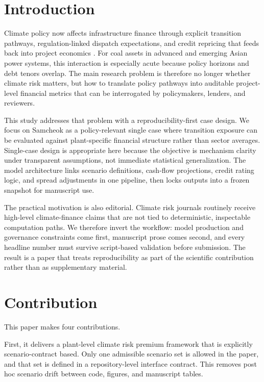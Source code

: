 \documentclass[preprint,12pt]{elsarticle}
\begin{document}
\section{Introduction}
Climate policy now affects infrastructure finance through explicit transition pathways, regulation-linked dispatch expectations, and credit repricing that feeds back into project economics \citep{giglio2021climate,battiston2017climate}. For coal assets in advanced and emerging Asian power systems, this interaction is especially acute because policy horizons and debt tenors overlap. The main research problem is therefore no longer whether climate risk matters, but how to translate policy pathways into auditable project-level financial metrics that can be interrogated by policymakers, lenders, and reviewers.

This study addresses that problem with a reproducibility-first case design. We focus on Samcheok as a policy-relevant single case where transition exposure can be evaluated against plant-specific financial structure rather than sector averages. Single-case design is appropriate here because the objective is mechanism clarity under transparent assumptions, not immediate statistical generalization. The model architecture links scenario definitions, cash-flow projections, credit rating logic, and spread adjustments in one pipeline, then locks outputs into a frozen snapshot for manuscript use.

The practical motivation is also editorial. Climate risk journals routinely receive high-level climate-finance claims that are not tied to deterministic, inspectable computation paths. We therefore invert the workflow: model production and governance constraints come first, manuscript prose comes second, and every headline number must survive script-based validation before submission. The result is a paper that treats reproducibility as part of the scientific contribution rather than as supplementary material.

\section{Contribution}
This paper makes four contributions.

First, it delivers a plant-level climate risk premium framework that is explicitly scenario-contract based. Only one admissible scenario set is allowed in the paper, and that set is defined in a repository-level interface contract. This removes post hoc scenario drift between code, figures, and manuscript tables.
\end{document}
